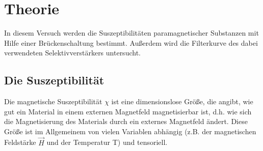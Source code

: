 \section{Theorie}
\label{sec:Theorie}

In diesem Versuch werden die Suszeptibilitäten paramagnetischer Substanzen 
mit Hilfe einer Brückenschaltung bestimmt. Außerdem wird die Filterkurve 
des dabei verwendeten Selektivverstärkers untersucht. 

\subsection{Die Suszeptibilität}

Die magnetische Suszeptibilität $\chi$ ist eine dimensionslose Größe, die 
angibt, wie gut ein Material in einem externen Magnetfeld magnetisierbar ist,
d.h. wie sich die Magnetisierung des Materials durch ein externes Magnetfeld 
ändert. Diese Größe ist im Allgemeinem von vielen Variablen abhängig (z.B. der
magnetischen Feldstärke $\vec{H}$ und der Temperatur T) und tensoriell. 

